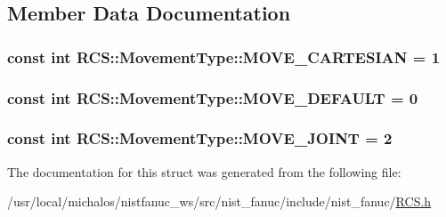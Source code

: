 \subsection{Member Data Documentation}
\hypertarget{structRCS_1_1MovementType_a48f63343f89482694485714786678746}{
\subsubsection[{M\-O\-V\-E\-\_\-\-C\-A\-R\-T\-E\-S\-I\-A\-N}]{\setlength{\rightskip}{0pt plus 5cm}const int R\-C\-S\-::\-Movement\-Type\-::\-M\-O\-V\-E\-\_\-\-C\-A\-R\-T\-E\-S\-I\-A\-N = 1\hspace{0.3cm}{\ttfamily [static]}}}\label{structRCS_1_1MovementType_a48f63343f89482694485714786678746}
\hypertarget{structRCS_1_1MovementType_a9e12637043666ace95425072b80ab2d9}{
\subsubsection[{M\-O\-V\-E\-\_\-\-D\-E\-F\-A\-U\-L\-T}]{\setlength{\rightskip}{0pt plus 5cm}const int R\-C\-S\-::\-Movement\-Type\-::\-M\-O\-V\-E\-\_\-\-D\-E\-F\-A\-U\-L\-T = 0\hspace{0.3cm}{\ttfamily [static]}}}\label{structRCS_1_1MovementType_a9e12637043666ace95425072b80ab2d9}
\hypertarget{structRCS_1_1MovementType_aed7721f148b578ffd0b9b1bd26a96b3f}{
\subsubsection[{M\-O\-V\-E\-\_\-\-J\-O\-I\-N\-T}]{\setlength{\rightskip}{0pt plus 5cm}const int R\-C\-S\-::\-Movement\-Type\-::\-M\-O\-V\-E\-\_\-\-J\-O\-I\-N\-T = 2\hspace{0.3cm}{\ttfamily [static]}}}\label{structRCS_1_1MovementType_aed7721f148b578ffd0b9b1bd26a96b3f}


The documentation for this struct was generated from the following file\-:\begin{DoxyCompactItemize}
\item 
/usr/local/michalos/nistfanuc\-\_\-ws/src/nist\-\_\-fanuc/include/nist\-\_\-fanuc/\hyperlink{RCS_8h}{R\-C\-S.\-h}\end{DoxyCompactItemize}
